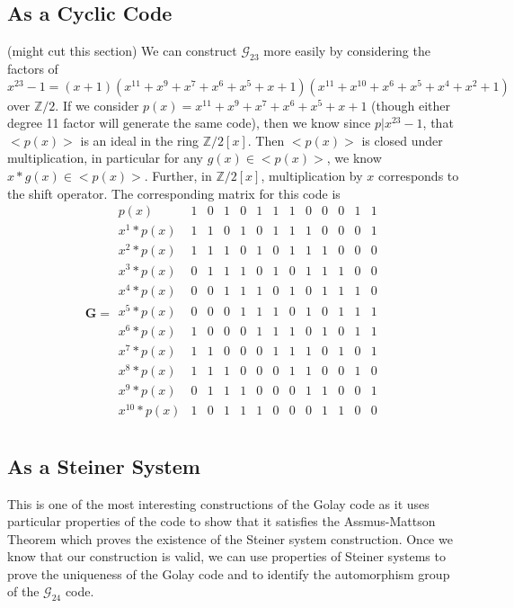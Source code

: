 \documentclass[paper=a4, fontsize=11pt]{scrartcl} %
\numberwithin{equation}{section} %
\numberwithin{figure}{section} %
\numberwithin{table}{section} %
\begin{document}
\subsection{As a Cyclic Code} (might cut this section)
We can construct $\mathcal{G}_{23}$ more easily by considering the factors of $$x^{23}-1=(x+1)(x^{11}+x^9+x^7+x^6+x^5+x+1)(x^{11}+x^{10}+x^6+x^5+x^4+x^2+1)$$ over $\mathbb{Z}/2$. If we consider $p(x)=x^{11}+x^9+x^7+x^6+x^5+x+1$ (though either degree 11 factor will generate the same code), then we know since $p|x^{23}-1$, that $<p(x)>$ is an ideal in the ring $\mathbb{Z}/2[x]$. Then $<p(x)>$ is closed under multiplication, in particular for any $g(x)\in<p(x)>$, we know $x*g(x)\in<p(x)>$. Further, in $\mathbb{Z}/2[x]$, multiplication by $x$ corresponds to the shift operator. The corresponding matrix for this code is 
$$\textbf{G} = \begin{array}{ccccccccccccc}
       p(x) & 1 & 0 & 1 & 0 & 1 & 1 & 1 & 0 & 0 & 0 & 1 & 1\\
   x^1*p(x) & 1 & 1 & 0 & 1 & 0 & 1 & 1 & 1 & 0 & 0 & 0 & 1\\
   x^2*p(x) & 1 & 1 & 1 & 0 & 1 & 0 & 1 & 1 & 1 & 0 & 0 & 0\\
   x^3*p(x) & 0 & 1 & 1 & 1 & 0 & 1 & 0 & 1 & 1 & 1 & 0 & 0\\
   x^4*p(x) & 0 & 0 & 1 & 1 & 1 & 0 & 1 & 0 & 1 & 1 & 1 & 0\\
   x^5*p(x) & 0 & 0 & 0 & 1 & 1 & 1 & 0 & 1 & 0 & 1 & 1 & 1\\
   x^6*p(x) & 1 & 0 & 0 & 0 & 1 & 1 & 1 & 0 & 1 & 0 & 1 & 1\\
   x^7*p(x) & 1 & 1 & 0 & 0 & 0 & 1 & 1 & 1 & 0 & 1 & 0 & 1\\
   x^8*p(x) & 1 & 1 & 1 & 0 & 0 & 0 & 1 & 1 & 0 & 0 & 1 & 0\\
   x^9*p(x) & 0 & 1 & 1 & 1 & 0 & 0 & 0 & 1 & 1 & 0 & 0 & 1\\
x^{10}*p(x) & 1 & 0 & 1 & 1 & 1 & 0 & 0 & 0 & 1 & 1 & 0 & 0\\
\end{array}$$

\subsection{As a Steiner System}
This is one of the most interesting constructions of the Golay code as it uses particular properties of the code to show that it satisfies the Assmus-Mattson Theorem which proves the existence of the Steiner system construction. Once we know that our construction is valid, we can use properties of Steiner systems to prove the uniqueness of the Golay code and to identify the automorphism group of the $\mathcal{G}_{24}$ code.
\end{document}

